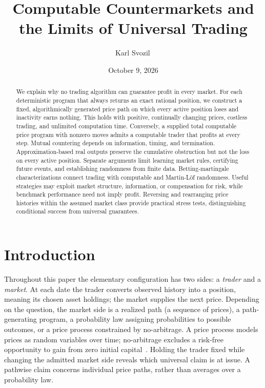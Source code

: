 \documentclass[aps,pra,reprint,superscriptaddress,amsmath,amssymb,floatfix]{revtex4-2}
\theoremstyle{plain}
\theoremstyle{definition}
\theoremstyle{remark}
\begin{document}
\title{Computable Countermarkets and the Limits of Universal Trading}

\author{Karl Svozil\,}

\date{October 9, 2026}

\begin{abstract}
We explain why no trading algorithm can guarantee profit in every market.
For each deterministic program that always returns an exact rational position,
we construct a fixed, algorithmically generated price path on which every active
position loses and inactivity earns nothing. This holds with positive,
continually changing prices, costless trading, and unlimited computation time.
Conversely, a supplied total computable price program with nonzero moves
admits a computable trader that profits at every step. Mutual countering
depends on information, timing, and termination.
Approximation-based real outputs preserve the cumulative obstruction but
not the loss on every active position. Separate arguments limit learning
market rules, certifying future events, and establishing randomness from
finite data. Betting-martingale characterizations connect trading with
computable and Martin-L\"of randomness.
Useful strategies may exploit market structure, information, or compensation
for risk, while benchmark performance need not imply profit. Reversing and
rearranging price histories within the assumed market class provide practical
stress tests, distinguishing conditional success from universal guarantees.
\end{abstract}

\maketitle

\section{Introduction}
\label{sec:intro}

Throughout this paper the elementary configuration has two sides: a
\emph{trader} and a \emph{market}. At each date the trader converts observed
history into a position, meaning its chosen asset holdings; the market supplies
the next price. Depending on the question, the market side is a realized path
(a sequence of prices), a path-generating program, a probability law assigning
probabilities to possible outcomes, or a price process constrained by
no-arbitrage. A price process models prices as random variables over time;
no-arbitrage excludes a risk-free opportunity to gain from zero initial
capital~\cite{Harrison1981,Delbaen1994}.
Holding the trader fixed while changing the admitted market side reveals which
universal claim is at issue. A pathwise claim concerns individual price paths,
rather than averages over a probability law.
\end{document}

